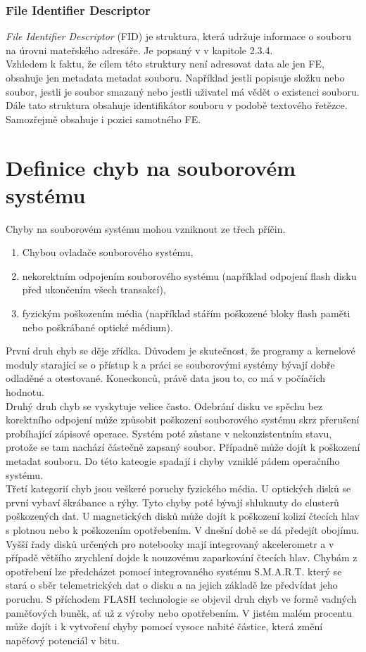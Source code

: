 \subsection{File Identifier Descriptor}
\label{sec:fid}
\textit{File Identifier Descriptor} (FID) je struktura, která udržuje informace o souboru na úrovni mateřského adresáře. Je popsaný v \cite{osta-udf-0201} v kapitole 2.3.4.\\
Vzhledem k faktu, že cílem této struktury není adresovat data ale jen FE, obsahuje jen metadata metadat souboru. Například jestli popisuje složku nebo soubor, jestli je soubor smazaný nebo jestli uživatel má vědět o existenci souboru. Dále tato struktura obsahuje identifikátor souboru v podobě textového řetězce. Samozřejmě obsahuje i pozici samotného FE.


\chapter{Definice chyb na souborovém systému}
Chyby na souborovém systému mohou vzniknout ze třech příčin. 
\begin{enumerate}
    \item Chybou ovladače souborového systému,
    \item nekorektním odpojením souborového systému (například odpojení flash disku před ukončením všech transakcí),
    \item fyzickým poškozením média (například stářím poškozené bloky flash paměti nebo poškrábané optické médium).
\end{enumerate}
První druh chyb se děje zřídka. Důvodem je skutečnost, že programy a kernelové moduly starající se o přístup k a práci se souborovými systémy bývají dobře odladěné a otestované. Koneckonců, právě data jsou to, co má v počíačích hodnotu.\\
Druhý druh chyb se vyskytuje velice často. Odebrání disku ve spěchu bez korektního odpojení může způsobit poškození souborového systému skrz přerušení probíhající zápisové operace. Systém poté zůstane v nekonzistentním stavu, protože se tam nachází částečně zapsaný soubor. Případně může dojít k poškození metadat souboru. Do této kateogie spadají i chyby vzniklé pádem operačního systému.\\
Třetí kategorií chyb jsou veškeré poruchy fyzického média. U optických disků se první vybaví škrábance a rýhy. Tyto chyby poté bývají shluknuty do clusterů poškozených dat. U magnetických disků může dojít k poškození kolizí čtecích hlav s plotnou nebo k poškozením opotřebením. V dnešní době se dá předejít obojímu. Vyšší řady disků určených pro notebooky mají integrovaný akcelerometr a v případě většího zrychlení dojde k nouzovému zaparkování čtecích hlav. Chybám z opotřebení lze předcházet pomocí integrovaného systému S.M.A.R.T. který se stará o sběr telemetrických dat o disku a na jejich základě lze předvídat jeho poruchu. S příchodem FLASH technologie se objevil druh chyb ve formě vadných paměťových buněk, ať už z výroby nebo opotřebením. V jistém malém procentu může dojít i k vytvoření chyby pomocí vysoce nabité částice, která změní napěťový potenciál v bitu.\\
